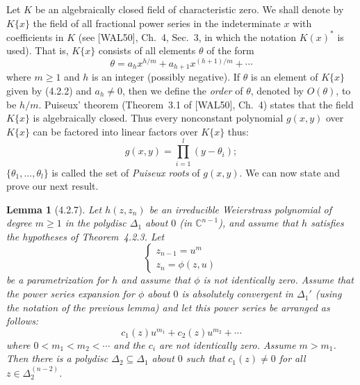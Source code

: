 \documentclass[11pt]{article}
\theoremstyle{plain}
\newtheorem*{lemma*}{Lemma}
\theoremstyle{definition}
\newcommand{\C}{\mathbb{C}}
\begin{document}
Let $K$ be an algebraically closed field of characteristic zero. We
shall denote by $K\{x\}$ the field of all fractional power series in
the indeterminate $x$ with coefficients in $K$ (see [WAL50], Ch.~4,
Sec.~3, in which the notation $K(x)^*$ is used). That is, $K\{x\}$
consists of all elements $\theta$ of the form
\begin{equation}
\theta = a_h x^{h/m} + a_{h+1} x^{(h+1)/m} + \cdots \tag{4.2.2}
\end{equation}
where $m \ge 1$ and $h$ is an integer (possibly negative). If
$\theta$ is an element of $K\{x\}$ given by (4.2.2) and $a_h \ne 0$,
then we define the \emph{order} of $\theta$, denoted by $O(\theta)$,
to be $h/m$. Puiseux' theorem (Theorem~3.1 of [WAL50], Ch.~4) states
that the field $K\{x\}$ is algebraically closed. Thus every
nonconstant polynomial $g(x, y)$ over $K\{x\}$ can be factored into
linear factors over $K\{x\}$ thus:
\[
g(x, y) = \prod_{i=1}^{l} (y - \theta_i);
\]
$\{ \theta_1, \ldots, \theta_l \}$ is called the set of
\emph{Puiseux roots} of $g(x, y)$. We can now state and prove our
next result.

\begin{lemma*}[4.2.7]
Let $h(z, z_n)$ be an irreducible Weierstrass polynomial of degree
$m \ge 1$ in the polydisc $\Delta_1$ about $0$ (in $\C^{n-1}$), and
assume that $h$ satisfies the hypotheses of Theorem~4.2.3. Let
\[
\begin{cases}
z_{n-1} = u^m \\
z_n = \phi(z, u)
\end{cases}
\]
be a parametrization for $h$ and assume that $\phi$ is not
identically zero. Assume that the power series expansion for $\phi$
about $0$ is absolutely convergent in $\Delta_1'$ (using the notation
of the previous lemma) and let this power series be arranged as
follows:
\[
c_1(z) u^{m_1} + c_2(z) u^{m_2} + \cdots
\]
where $0 < m_1 < m_2 < \cdots$ and the $c_i$ are not identically
zero. Assume $m > m_1$. Then there is a polydisc
$\Delta_2 \subseteq \Delta_1$ about $0$ such that $c_1(z) \ne 0$ for
all $z \in \Delta_2^{(n-2)}$.
\end{lemma*}
\end{document}
